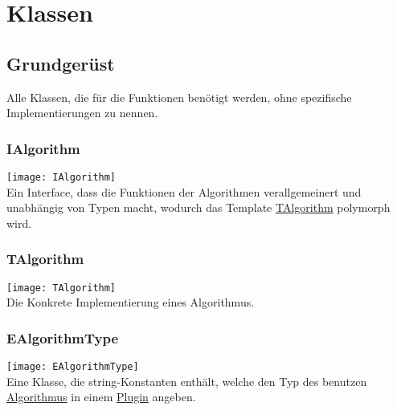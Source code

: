 \section{Klassen}
\graphicspath{{./img/workflow/}}
\subsection{Grundgerüst}
Alle Klassen, die für die Funktionen benötigt werden, ohne spezifische Implementierungen zu nennen.
\subsubsection{IAlgorithm}\label{Workflow:IAlgorithm}
\texttt{[image: IAlgorithm]}\\
Ein Interface, dass die Funktionen der Algorithmen verallgemeinert und unabhängig von Typen macht, wodurch das Template \hyperref[Workflow:TAlgorithm]{TAlgorithm} polymorph wird.
\beginMembers
{}
\closeMembers

\subsubsection{TAlgorithm}\label{Workflow:TAlgorithm}
\texttt{[image: TAlgorithm]}\\
Die Konkrete Implementierung eines Algorithmus.
\beginMembers
{}
\closeMembers

\subsubsection{EAlgorithmType}\label{Workflow:EAlgorithmType}
\texttt{[image: EAlgorithmType]}\\
Eine Klasse, die string-Konstanten enthält, welche den Typ des benutzen \hyperref[Workflow:IAlgorithm]{Algorithmus} in einem \hyperref[Workflow:APlugin]{Plugin} angeben.
\beginAttributes
{}
\closeMembers

